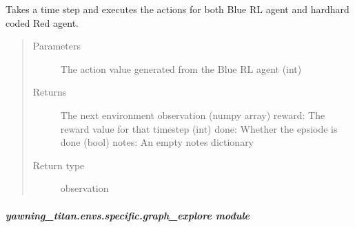 \documentclass[letterpaper,10pt,english]{sphinxmanual}
\begin{document}
\begin{fulllineitems}
\begin{fulllineitems}
\begin{quote}
\begin{description}
\end{description}\end{quote}

\end{fulllineitems}


\begin{fulllineitems}
\label{\detokenize{source/yawning_titan.envs.specific:yawning_titan.envs.specific.four_node_def.FourNodeDef.step}}
\sphinxAtStartPar
Takes a time step and executes the actions for both Blue RL agent and
hard\sphinxhyphen{}hard coded Red agent.
\begin{quote}\begin{description}
\item[{Parameters}] \leavevmode
\sphinxAtStartPar
{} \textendash{} The action value generated from the Blue RL agent (int)

\item[{Returns}] \leavevmode
\sphinxAtStartPar
The next environment observation (numpy array)
reward: The reward value for that timestep (int)
done: Whether the epsiode is done (bool)
notes: An empty notes dictionary

\item[{Return type}] \leavevmode
\sphinxAtStartPar
observation

\end{description}\end{quote}

\end{fulllineitems}


\end{fulllineitems}



\subparagraph{yawning\_titan.envs.specific.graph\_explore module}
\label{\detokenize{source/yawning_titan.envs.specific:module-yawning_titan.envs.specific.graph_explore}}\label{\detokenize{source/yawning_titan.envs.specific:yawning-titan-envs-specific-graph-explore-module}}
\end{document}
